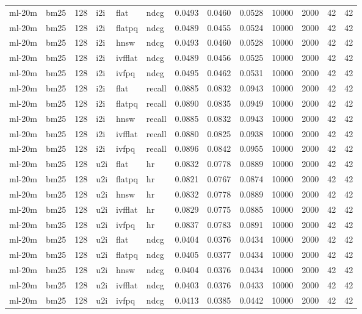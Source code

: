 \begin{tabular}{llrlllrrrrrrr}
ml-20m & bm25 & 128 & i2i & flat & ndcg & 0.0493 & 0.0460 & 0.0528 & 10000 & 2000 & 42 & 42 \\
ml-20m & bm25 & 128 & i2i & flatpq & ndcg & 0.0489 & 0.0455 & 0.0524 & 10000 & 2000 & 42 & 42 \\
ml-20m & bm25 & 128 & i2i & hnsw & ndcg & 0.0493 & 0.0460 & 0.0528 & 10000 & 2000 & 42 & 42 \\
ml-20m & bm25 & 128 & i2i & ivfflat & ndcg & 0.0489 & 0.0456 & 0.0525 & 10000 & 2000 & 42 & 42 \\
ml-20m & bm25 & 128 & i2i & ivfpq & ndcg & 0.0495 & 0.0462 & 0.0531 & 10000 & 2000 & 42 & 42 \\
ml-20m & bm25 & 128 & i2i & flat & recall & 0.0885 & 0.0832 & 0.0943 & 10000 & 2000 & 42 & 42 \\
ml-20m & bm25 & 128 & i2i & flatpq & recall & 0.0890 & 0.0835 & 0.0949 & 10000 & 2000 & 42 & 42 \\
ml-20m & bm25 & 128 & i2i & hnsw & recall & 0.0885 & 0.0832 & 0.0943 & 10000 & 2000 & 42 & 42 \\
ml-20m & bm25 & 128 & i2i & ivfflat & recall & 0.0880 & 0.0825 & 0.0938 & 10000 & 2000 & 42 & 42 \\
ml-20m & bm25 & 128 & i2i & ivfpq & recall & 0.0896 & 0.0842 & 0.0955 & 10000 & 2000 & 42 & 42 \\
ml-20m & bm25 & 128 & u2i & flat & hr & 0.0832 & 0.0778 & 0.0889 & 10000 & 2000 & 42 & 42 \\
ml-20m & bm25 & 128 & u2i & flatpq & hr & 0.0821 & 0.0767 & 0.0874 & 10000 & 2000 & 42 & 42 \\
ml-20m & bm25 & 128 & u2i & hnsw & hr & 0.0832 & 0.0778 & 0.0889 & 10000 & 2000 & 42 & 42 \\
ml-20m & bm25 & 128 & u2i & ivfflat & hr & 0.0829 & 0.0775 & 0.0885 & 10000 & 2000 & 42 & 42 \\
ml-20m & bm25 & 128 & u2i & ivfpq & hr & 0.0837 & 0.0783 & 0.0891 & 10000 & 2000 & 42 & 42 \\
ml-20m & bm25 & 128 & u2i & flat & ndcg & 0.0404 & 0.0376 & 0.0434 & 10000 & 2000 & 42 & 42 \\
ml-20m & bm25 & 128 & u2i & flatpq & ndcg & 0.0405 & 0.0377 & 0.0434 & 10000 & 2000 & 42 & 42 \\
ml-20m & bm25 & 128 & u2i & hnsw & ndcg & 0.0404 & 0.0376 & 0.0434 & 10000 & 2000 & 42 & 42 \\
ml-20m & bm25 & 128 & u2i & ivfflat & ndcg & 0.0403 & 0.0376 & 0.0433 & 10000 & 2000 & 42 & 42 \\
ml-20m & bm25 & 128 & u2i & ivfpq & ndcg & 0.0413 & 0.0385 & 0.0442 & 10000 & 2000 & 42 & 42 \\

\end{tabular}
